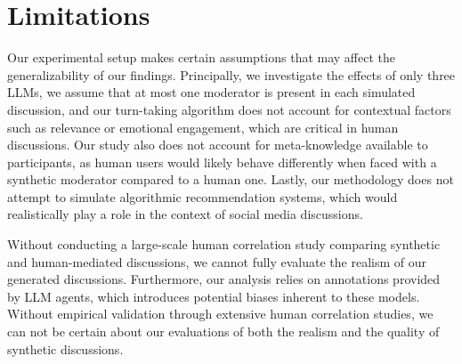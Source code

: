 %
\section{Limitations} 
\label{sec:limitations}

Our experimental setup makes certain assumptions that may affect the generalizability of our findings. Principally, we investigate the effects of only three \acp{LLM}, we assume that at most one moderator is present in each simulated discussion, and our turn-taking algorithm does not account for contextual factors such as relevance or emotional engagement, which are critical in human discussions. Our study also does not account for meta-knowledge available to participants, as human users would likely behave differently when faced with a synthetic moderator compared to a human one. Lastly, our methodology does not attempt to simulate algorithmic recommendation systems, which would realistically play a role in the context of social media discussions.

Without conducting a large-scale human correlation study comparing synthetic and human-mediated discussions, we cannot fully evaluate the realism of our generated discussions. Furthermore, our analysis relies on annotations provided by \ac{LLM} agents, which introduces potential biases inherent to these models. Without empirical validation through extensive human correlation studies, we can not be certain about our evaluations of both the realism and the quality of synthetic discussions.